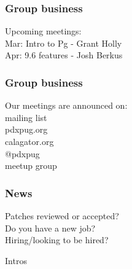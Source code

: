 \documentclass{beamer}
\begin{document}
\frame
{
  \frametitle{Group business}
  \begin{center}
{\large Upcoming meetings:\\}
Mar: Intro to Pg - Grant Holly\\
Apr: 9.6 features - Josh Berkus\\
\vspace{5mm}
  \end{center}
}

\frame
{
  \frametitle{Group business}
  \begin{center}
{\large Our meetings are announced on:\\}
mailing list\\
pdxpug.org\\
calagator.org\\
@pdxpug\\
meetup group\\
\vspace{5mm}
  \end{center}
}

\frame
{
  \frametitle{News}
  \begin{center}
Patches reviewed or accepted?\\
Do you have a new job?\\
Hiring/looking to be hired?\\
  \end{center}
}

\frame
{
  \begin{center}
{\huge Intros\\}
  \end{center}
}
\end{document}
